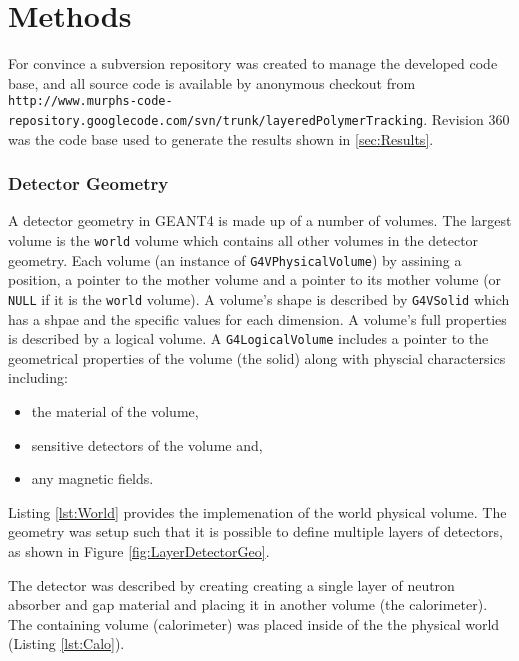 \section{Methods}
\label{sec:Methods}

For convince a subversion repository was created to manage the developed code base, and all source code is available by anonymous checkout from \verb+http://www.murphs-code-repository.googlecode.com/svn/trunk/layeredPolymerTracking+. Revision 360 was the code base used to generate the results shown in \ref{sec:Results}.

\subsubsection{Detector Geometry}
A detector geometry in GEANT4 is made up of a number of volumes.
The largest volume is the \verb+world+ volume which contains all other volumes in the detector geometry.
Each volume (an instance of \verb+G4VPhysicalVolume+) by assining a position, a pointer to the mother volume and a pointer to its mother volume (or \verb+NULL+ if it is the \verb+world+ volume).
A volume's shape is described by \verb+G4VSolid+ which has a shpae and the specific values for each dimension.
A volume's full properties is described by a logical volume.
A \verb+G4LogicalVolume+ includes a pointer to the geometrical properties of the volume (the solid) along with physcial charactersics including:
\begin{itemize}
    \item the material of the volume,
    \item sensitive detectors of the volume and,
    \item any magnetic fields.
\end{itemize}
Listing \ref{lst:World} provides the implemenation of the world physical volume.
The geometry was setup such that it is possible to define multiple layers of detectors, as shown in Figure \ref{fig:LayerDetectorGeo}.

The detector was described by creating creating a single layer of neutron absorber and gap material and placing it in another volume (the calorimeter).
The containing volume (calorimeter) was placed inside of the the physical world (Listing \ref{lst:Calo}).

